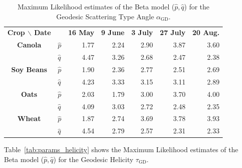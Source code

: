 \documentclass[journal]{IEEEtran}
\begin{document}
{\begin{table}[hbt]
	\centering
	\caption{Maximum Likelihood estimates of the Beta model ($\widehat p,\widehat q$) for the Geodesic Scattering Type Angle $\alpha_{\text{GD}}$.}
	\label{tab:params_alpha}
	\setlength{\tabcolsep}{3.8pt}
	\begin{tabular}{clrrrrr}
		\toprule
		\textbf{Crop $\backslash$ Date} & & \textbf{16 May} & \textbf{9 June} & \textbf{3 July} & \textbf{27 July} & \textbf{20 Aug.}\\ \cmidrule{1-2} \cmidrule(lr){3-3} \cmidrule(lr){4-4} \cmidrule(lr){5-5} \cmidrule(lr){6-6} \cmidrule(lr){7-7}
		\textbf{Canola} 	
		& $\widehat{p}$ & 1.77     & 2.24      & 2.90      & 3.87      & 3.60 \\
		& $\widehat{q}$ & 4.47     & 3.26     & 2.68     & 2.47     & 2.38\\ 
		\midrule
		\textbf{Soy Beans} 
		& $\widehat{p}$ & 1.90      & 2.36      & 2.77      & 2.51      & 2.69 \\
		& $\widehat{q}$ & 4.23     & 3.33     & 3.15      & 3.11     & 2.89\\ 
		\midrule
		\textbf{Oats}
		& $\widehat{p}$ & 2.03       & 1.79      & 3.00      & 3.70      & 4.00 \\
		& $\widehat{q}$ & 4.09     & 3.03     & 2.72     & 2.48     & 2.35\\ 
		\midrule
		\textbf{Wheat}
		& $\widehat{p}$ & 1.87       & 2.74      & 3.69      & 3.78      & 3.93 \\
		& $\widehat{q}$ & 4.54     & 2.79     & 2.57     & 2.31     & 2.33\\
		\bottomrule
	\end{tabular}
\end{table}



Table~\ref{tab:params_helicity} shows the Maximum Likelihood estimates of the Beta model ($\widehat p,\widehat q$) for the Geodesic Helicity $\tau_{\text{GD}}$.

}
\end{document}
